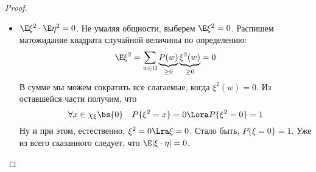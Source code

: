 \begin{proof}
\begin{enumerate}
\begin{itemize}
			\item $\E\xi^2 \cdot \E\eta^2 = 0$. Не умаляя общности, выберем $\E\xi^2 = 0$. Распишем матожидание квадрата случайной величины по определению:
			\[
				\E\xi^2 = \sum_{w \in \Omega} \underbrace{P(w)}_{\ge 0} \underbrace{\xi^2(w)}_{\ge 0} = 0
			\]
			В сумме мы можем сократить все слагаемые, когда $\xi^2(w) = 0$. Из оставшейся части получим, что
			\[
				\forall x \in \chi_\xi \bs \{0\} \quad P\{\xi^2 = x\} = 0 \Lora P\{\xi^2 = 0\} = 1
			\]
			Ну и при этом, естественно, $\xi^2 = 0 \Lra \xi = 0$. Стало быть, $P\{\xi = 0\} = 1$. Уже из всего сказанного следует, что $\E |\xi \cdot \eta| = 0$.
		\end{itemize}
	\end{enumerate}
\end{proof}